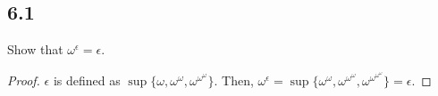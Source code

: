 \subsection*{6.1} Show that $\omega^\epsilon = \epsilon$.

\begin{proof}
    $\epsilon$ is defined as $\sup\{\omega, \omega^{\omega}, \omega^{\omega^{\omega}}\}$. Then, $\omega^\epsilon = \sup\{\omega^{\omega}, \omega^{\omega^{\omega}}, \omega^{\omega^{\omega^{\omega}}}\} = \epsilon$.
\end{proof}

